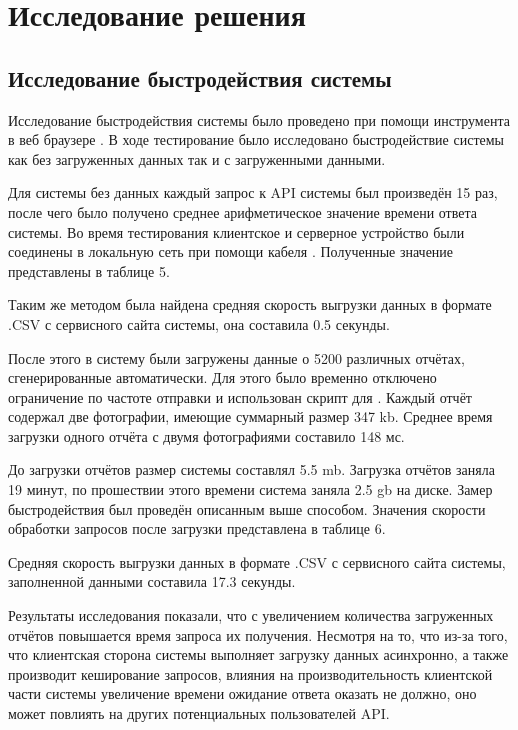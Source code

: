 
\section{Исследование решения}

\subsection{Исследование быстродействия системы}

\tab
Исследование быстродействия системы было проведено при помощи инструмента  в веб браузере . В ходе тестирование было исследовано быстродействие системы как без загруженных данных так и с загруженными данными.

\tab
Для системы без данных каждый запрос к API системы был произведён 15 раз, после чего было получено среднее арифметическое значение времени ответа системы.
Во время тестирования клиентское и серверное устройство были соединены в локальную сеть при помощи кабеля .
Полученные значение представлены в таблице 5.
\tablefive

\tab
Таким же методом была найдена средняя скорость выгрузки данных в формате .CSV с сервисного сайта системы, она составила 0.5 секунды.

\tab
После этого в систему были загружены данные о 5200 различных отчётах, сгенерированные автоматически.
Для этого было временно отключено ограничение по частоте отправки и использован скрипт для .
Каждый отчёт содержал две фотографии, имеющие суммарный размер 347 kb. Среднее время загрузки одного отчёта с двумя фотографиями составило 148 мс.

\tab
До загрузки отчётов размер системы составлял 5.5 mb.
Загрузка отчётов заняла 19 минут, по прошествии этого времени система заняла 2.5 gb на диске.
Замер быстродействия был проведён описанным выше способом.
Значения скорости обработки запросов после загрузки представлена в таблице 6.
\tablesix

\tab
Средняя скорость выгрузки данных в формате .CSV с сервисного сайта системы, заполненной данными составила 17.3 секунды.

\tab
Результаты исследования показали, что с увеличением количества загруженных отчётов повышается время запроса их получения.
Несмотря на то, что из-за того, что клиентская сторона системы выполняет загрузку данных асинхронно, а также производит кеширование запросов, влияния на производительность клиентской части системы увеличение времени ожидание ответа оказать не должно, оно может повлиять на других потенциальных пользователей API.

